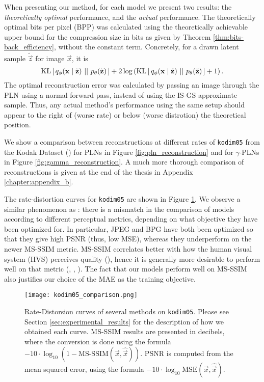 \par
When presenting our method, for each model we present two results: the \textit{theoretically
optimal} performance, and the \textit{actual} performance. The theoretically
optimal bits per pixel (BPP) was calculated using the theoretically
achievable upper bound for the compression size in bits as given by
Theorem \ref{thm:bits-back_efficiency}, without the constant term. Concretely,
for a drawn latent sample $\tilde{\vec{z}}$ for image $\vec{x}$, it is 
\[
  \mathrm{KL}\left[\,q_\phi(\mathbf{x} \mid \tilde{\mathbf{z}})\,\,||\,\,p_\theta(\tilde{\mathbf{z}})\,\right]
  + 2 \log \left( \mathrm{KL}\left[\,q_\phi(\mathbf{x}
      \mid \tilde{\mathbf{z}})\,\,||\,\,p_\theta(\tilde{\mathbf{z}})\,\right] + 1 \right).
\]
The optimal reconstruction error was calculated by passing an image through the
PLN using a normal forward pass, instead of using the IS-GS approximate sample. Thus, any
actual method's performance using the same setup should appear to the right of
(worse rate) or below (worse distrotion) the theoretical position.


\par
We show a comparison between reconstructions at different rates of
\texttt{kodim05} from the Kodak Dataset (\cite{kodakdataset}) for PLNs in Figure
\ref{fig:pln_reconstruction} and for $\gamma$-PLNs in Figure
\ref{fig:gamma_reconstruction}. A much more thorough comparison of
reconstructions is given at the end of the thesis in Appendix \ref{chapter:appendix_b}.
\par
The rate-distortion curves for \texttt{kodim05} are shown in Figure
\ref{fig:kodim05_comp}. We observe a similar phenomenon as
\cite{balle2018variational}: there is a mismatch in the comparison
of models according to different perceptual metrics, depending on what objective
they have been optimized for. In particular, JPEG and BPG have both been
optimized so that they give high PSNR (thus, low MSE), whereas they underperform
on the newer MS-SSIM metric. MS-SSIM correlates better with how
the human visual system (HVS) perceives quality (\cite{msssim}),
hence it is generally more desirable to perform well on that metric
(\cite{toderici2017full}, \cite{rippel2017real}, \cite{balle2018variational}).
The fact that our models perform well on MS-SSIM also justifies our choice of
the MAE as the training objective.
\begin{figure}
  \centering
  \texttt{[image: kodim05\_comparison.png]}
  \caption[Rate-Distorsion curves of several methods on \texttt{kodim05}]
  {Rate-Distorsion curves of several methods on \texttt{kodim05}. Please see
    Section \ref{sec:experimental_results} for the description of how we
    obtained each curve. MS-SSIM results are presented in
    decibels, where the conversion is done using the formula $-10 \cdot
    \log_{10}\left( 1 - \text{MS-SSIM}(\vec{x}, \hat{\vec{x}}) \right)$.
    PSNR is computed from the mean squared error, using the formula 
    $-10 \cdot \log_{10}\text{MSE}(\vec{x}, \hat{\vec{x}})$.}
  \label{fig:kodim05_comp}
\end{figure}

